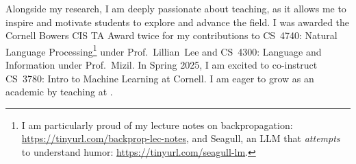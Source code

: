 
Alongside my research, I am deeply passionate about teaching, as it allows me to inspire and motivate students to explore and advance the field.
%
I was awarded the Cornell Bowers CIS TA Award twice for my contributions to CS~4740: Natural Language Processing\footnote{I am particularly proud of my lecture notes on backpropagation: \url{https://tinyurl.com/backprop-lec-notes}, and Seagull, an LLM that \textit{attempts} to understand humor: \url{https://tinyurl.com/seagull-lm}.} under Prof.~Lillian~Lee and CS~4300: Language and Information under Prof.~Mizil. 
%
In Spring 2025, I am excited to co-instruct CS~3780: Intro to Machine Learning at Cornell.
%
I am eager to grow as an academic by teaching at \thecollegeabbr.